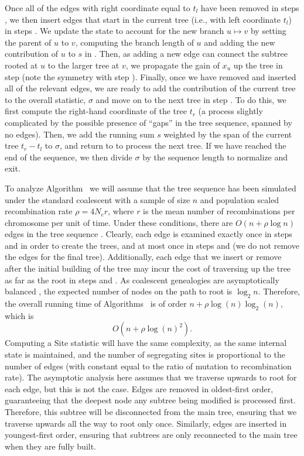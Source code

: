 \documentclass{article}
\begin{document}
Once all of the edges with right coordinate equal to $t_l$ have been removed in
steps , we then insert edges that start in the current tree
(i.e., with left coordinate $t_l$) in steps . We update the
state to account for the new branch $u \mapsto v$ by setting the parent of
$u$ to $v$, computing the branch length of $u$ and adding the new contribution
of $u$ to $s$ in . Then, as adding a new edge can connect the
subtree rooted at $u$ to the larger tree at $v$, we propagate the gain of $x_u$
up the tree in step  (note the symmetry with step ).
Finally, once we have removed and inserted all of the relevant edges, we are
ready to add the contribution of the current tree to the overall statistic,
$\sigma$ and move on to the next tree in step . To do this, we first
compute the right-hand coordinate of the tree $t_r$ (a process slightly
complicated by the possible presence of ``gaps'' in the tree sequence, spanned
by no edges). Then, we add the running sum $s$ weighted by the span of the
current tree $t_r - t_l$ to $\sigma$, and return to  to process the
next tree. If we have reached the end of the sequence, we then divide $\sigma$
by the sequence length to normalize and exit.

To analyze Algorithm~ we will assume that the tree sequence has
been simulated under the standard coalescent with a sample of size
$n$ and population scaled recombination rate $\rho = 4 N_e r$,
where $r$ is the mean number of recombinations per chromosome per unit of time.
Under these conditions, there are $O(n + \rho \log n)$ edges in the tree sequence
\citep{kelleher2016efficient}.  Clearly, each edge is examined
exactly once in steps  and  in order to create
the trees, and at most once in steps  and  (we do
not remove the edges for the final tree). Additionally, each edge that
we insert or remove after the initial building of the tree
may incur the cost of traversing up the tree as
far as the root in steps  and .
As coalescent genealogies are asymptotically
balanced \citep{li2013coalescent}, the expected number of nodes
on the path to root is $\log_2 n$.
Therefore, the overall running time
of Algorithms~ is of order $n + \rho \log(n) \log_2(n)$, which is
\begin{equation}\label{eqn:alg_complexity}
    O\left(n + \rho \log(n)^2 \right).
\end{equation}
Computing a Site statistic will have the same complexity,
as the same internal state is maintained,
and the number of segregating sites is proportional to the number of edges
(with constant equal to the ratio of mutation to recombination rate).
The asymptotic analysis here assumes that we traverse upwards to root
for each edge, but this is not the case. Edges are removed in
oldest-first order, guaranteeing that the deepest node any subtree being
modified is processed first. Therefore, this subtree will be disconnected from the
main tree, ensuring that we traverse upwards all the way to root only once.
Similarly, edges are inserted in youngest-first order, ensuring that subtrees are only
reconnected to the main tree when they are fully built.
\end{document}
